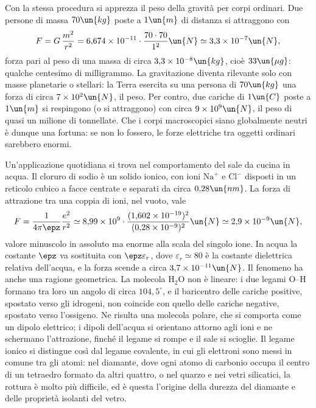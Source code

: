 \documentclass[main.tex]{subfiles}
\begin{document}
Con la stessa procedura si apprezza il peso della gravità per corpi ordinari. Due persone di massa $70\un{kg}$ poste a $1\un{m}$ di distanza si attraggono con
\[
F=G\,\frac{m^2}{r^2}=6{,}674\times10^{-11}\cdot\frac{70\cdot70}{1^2}\un{N}\simeq 3{,}3\times10^{-7}\un{N},
\]
forza pari al peso di una massa di circa $3{,}3\times10^{-8}\un{kg}$, cioè $33\un{\mu g}$: qualche centesimo di milligrammo. La gravitazione diventa rilevante solo con masse planetarie o stellari: la Terra esercita su una persona di $70\un{kg}$ una forza di circa $7\times10^{2}\un{N}$, il peso. Per contro, due cariche di $1\un{C}$ poste a $1\un{m}$ si respingono (o si attraggono) con circa $9\times10^{9}\un{N}$, il peso di quasi un milione di tonnellate. Che i corpi macroscopici siano globalmente neutri è dunque una fortuna: se non lo fossero, le forze elettriche tra oggetti ordinari sarebbero enormi.

Un'applicazione quotidiana si trova nel comportamento del sale da cucina in acqua. Il cloruro di sodio è un solido ionico, con ioni $\mathrm{Na}^+$ e $\mathrm{Cl}^-$ disposti in un reticolo cubico a facce centrate e separati da circa $0{,}28\un{nm}$. La forza di attrazione tra una coppia di ioni, nel vuoto, vale
\[
F=\frac{1}{4\pi\epz}\frac{e^2}{r^2}\simeq 8{,}99\times10^{9}\cdot\frac{(1{,}602\times10^{-19})^2}{(0{,}28\times10^{-9})^2}\un{N}\simeq 2{,}9\times10^{-9}\un{N},
\]
valore minuscolo in assoluto ma enorme alla scala del singolo ione. In acqua la costante $\epz$ va sostituita con $\epz\varepsilon_r$, dove $\varepsilon_r\simeq80$ è la costante dielettrica relativa dell'acqua, e la forza scende a circa $3{,}7\times10^{-11}\un{N}$. Il fenomeno ha anche una ragione geometrica. La molecola $\mathrm{H_2O}$ non è lineare: i due legami O--H formano tra loro un angolo di circa $104{,}5^\circ$, e il baricentro delle cariche positive, spostato verso gli idrogeni, non coincide con quello delle cariche negative, spostato verso l'ossigeno. Ne risulta una molecola polare, che si comporta come un dipolo elettrico; i dipoli dell'acqua si orientano attorno agli ioni e ne schermano l'attrazione, finché il legame si rompe e il sale si scioglie. Il legame ionico si distingue così dal legame covalente, in cui gli elettroni sono messi in comune tra gli atomi: nel diamante, dove ogni atomo di carbonio occupa il centro di un tetraedro formato da altri quattro, o nel quarzo e nei vetri silicatici, la rottura è molto più difficile, ed è questa l'origine della durezza del diamante e delle proprietà isolanti del vetro.
\end{document}
